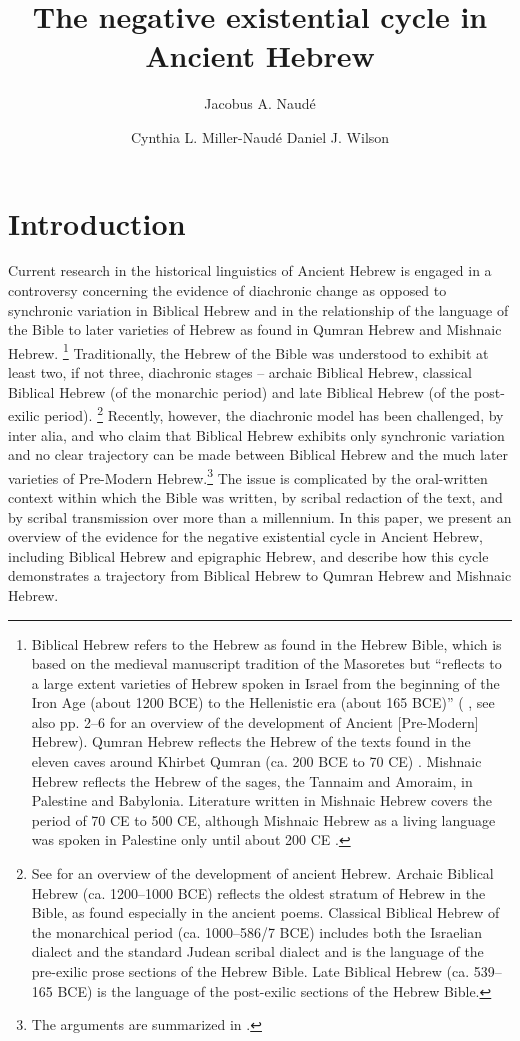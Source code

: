 ﻿\documentclass[output=paper]{langsci/langscibook}
\author{Jacobus A. Naudé\affiliation{University of the Free State}\and
Cynthia L. Miller-Naudé\affiliation{University of the Free State}\lastand
Daniel J. Wilson\affiliation{University of the Free State}
}
\title{The negative existential cycle in Ancient Hebrew}
\begin{document}
\section{Introduction}\label{sec:Hebrew-1}

Current research in the historical linguistics of Ancient Hebrew is engaged in a controversy concerning the evidence of diachronic
change as opposed to synchronic variation in Biblical Hebrew and in the
relationship of the language of the Bible to later varieties of Hebrew as
found in Qumran %
Hebrew and Mishnaic Hebrew.%
%
\footnote{Biblical Hebrew
refers to the Hebrew as found in the Hebrew Bible, which is based on the
medieval manuscript tradition of the Masoretes but ``reflects to a large
extent varieties of Hebrew spoken in Israel from the beginning of the Iron
Age (about 1200 BCE) to the Hellenistic era (about 165 BCE)'' (%
\cite[1]{MerweNaude2017}, see also pp. 2--6 for an overview of the
development of Ancient [Pre-Modern] Hebrew). Qumran Hebrew reflects the
Hebrew of the texts found in the eleven caves around Khirbet Qumran (ca.
200 BCE to 70 CE)
\parencites(see)(){Naude2003}{NaudeMiller2016b}%
.
Mishnaic Hebrew reflects the Hebrew of the sages, the Tannaim and Amoraim,
in Palestine and Babylonia. Literature written in Mishnaic Hebrew covers
the period of 70 CE to 500 CE, although Mishnaic Hebrew as a living
language was spoken in Palestine only until about 200 CE \parencites%
[116]{BarAsher1999}[see also][5]{MerweNaude2017}{NaudeMiller2016b}.}%
%
Traditionally, the Hebrew of the Bible was understood to exhibit at least
two, if not three, diachronic stages -- archaic Biblical Hebrew, classical
Biblical Hebrew (of the monarchic period) and late Biblical Hebrew (of the
post-exilic period).%
%
\footnote{See \textcite[1--6]{MerweNaude2017} for an overview of the
development of ancient Hebrew. Archaic Biblical Hebrew (ca. 1200--1000 BCE)
reflects the oldest stratum of Hebrew in the Bible, as found especially in
the ancient poems. Classical Biblical Hebrew of the monarchical period (ca.
1000--586\slash 7 BCE) includes both the Israelian dialect and the standard
Judean scribal dialect and is the language of the pre-exilic prose sections
of the Hebrew Bible. Late Biblical Hebrew (ca.  539--165 BCE) is the
language of the post-exilic sections of the Hebrew Bible.} Recently,
however, the diachronic model has been challenged, by inter alia,
\textcite{YoungRezetko2008} and \textcite{RezetkoYoung2014} who claim that
Biblical Hebrew exhibits only synchronic variation and no clear trajectory
can be made between Biblical Hebrew and the much later varieties of
Pre-Modern Hebrew.\footnote{The arguments are summarized in
\cites{NaudeMiller2016a}{NaudeMiller2016b}.} The issue is complicated by
the oral-written context within which the Bible was written, by scribal
redaction of the text, and by scribal transmission over more than a
millennium. In this paper, we present an overview of the evidence for the
negative existential cycle in Ancient Hebrew, including Biblical Hebrew and
epigraphic Hebrew, and describe how this cycle demonstrates a trajectory
from Biblical Hebrew to Qumran Hebrew and Mishnaic Hebrew.
\end{document}
